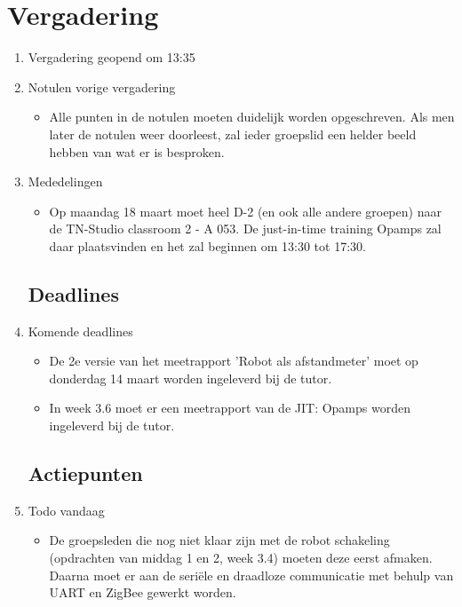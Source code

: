 \documentclass{article}
\begin{document}
\section*{Vergadering}
\begin{enumerate}
	
\subsection*{Vooraf}
\item Vergadering geopend om 13:35

\item Notulen vorige vergadering
\begin{itemize}
\item Alle punten in de notulen moeten duidelijk worden opgeschreven. Als men later de notulen weer doorleest, zal ieder groepslid een helder beeld hebben van wat er is besproken.
\end{itemize}

\item Mededelingen
\begin{itemize}
\item Op maandag 18 maart moet heel D-2 (en ook alle andere groepen) naar de TN-Studio classroom 2 - A 053. De just-in-time training Opamps zal daar plaatsvinden en het zal beginnen om 13:30 tot 17:30.
\end{itemize}

\subsection*{Deadlines}
\item Komende deadlines
\begin{itemize}
\item De 2e versie van het meetrapport 'Robot als afstandmeter' moet op donderdag 14 maart worden ingeleverd bij de tutor.
\item In week 3.6 moet er een meetrapport van de JIT: Opamps worden ingeleverd bij de tutor. 
\end{itemize}

\subsection*{Actiepunten}
\item Todo vandaag
\begin{itemize}
\item De groepsleden die nog niet klaar zijn met de robot schakeling (opdrachten van middag 1 en 2, week 3.4) moeten deze eerst afmaken. Daarna moet er aan de seriële en draadloze communicatie met behulp van UART en ZigBee gewerkt worden. 
\end{itemize}


\end{enumerate}
\end{document}
